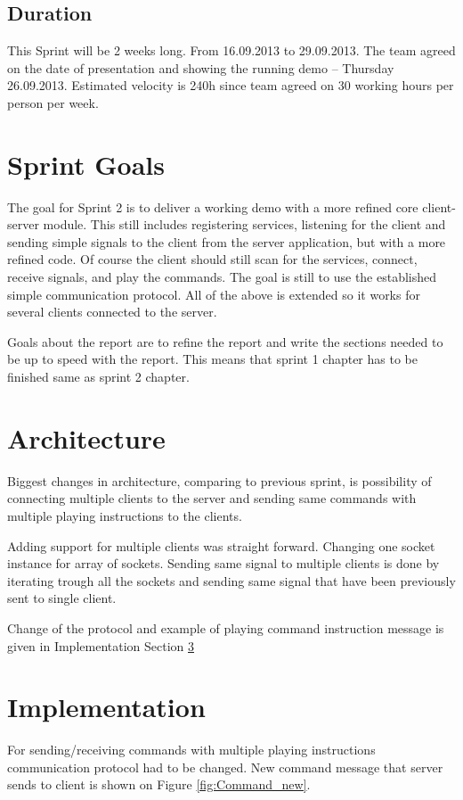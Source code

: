 \subsection{Duration}
This Sprint will be 2 weeks long. From 16.09.2013 to 29.09.2013.
The team agreed on the date of presentation and showing the running demo -- Thursday 26.09.2013.
Estimated velocity is 240h since team agreed on 30 working hours per person per week.

\section{Sprint Goals}
The goal for Sprint 2 is to deliver a working demo with a more refined core client-server module. 
This still includes registering services, listening for the client and sending simple signals to the client from the server application, but with a more refined code. 
Of course the client should still scan for the services, connect, receive signals, and play the commands. 
The goal is still to use the established simple communication protocol. 
All of the above is extended so it works for several clients connected to the server.

Goals about the report are to refine the report and write the sections needed to be up to speed with the report. This means that sprint 1 chapter has to be finished same as sprint 2 chapter. 

\section{Architecture}
Biggest changes in architecture, comparing to previous sprint, is possibility of connecting multiple clients to the server and sending same commands with multiple playing instructions to the clients. 

Adding support for multiple clients was straight forward. Changing one socket instance for array of sockets. Sending same signal to multiple clients is done by iterating trough all the sockets and sending same signal that have been previously sent to single client.

Change of the protocol and example of playing command instruction message is given in Implementation Section \ref{section:impl}


\section{Implementation} \label{section:impl}
For sending/receiving commands with multiple playing instructions communication protocol had to be changed. New command message that server sends to client is shown on Figure \ref{fig:Command_new}.

